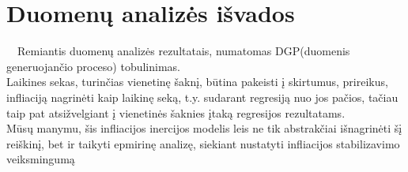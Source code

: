 \documentclass[a4paper]{article}
\begin{document}
\newpage
\section{Duomenų analizės išvados}
\textnormal{\             \ Remiantis duomenų analizės rezultatais, numatomas DGP(duomenis generuojančio proceso) tobulinimas.\\ Laikines sekas, turinčias vienetinę šaknį, būtina pakeisti į skirtumus, prireikus, infliaciją nagrinėti kaip laikinę seką,  t.y. sudarant regresiją nuo jos pačios, tačiau taip pat atsižvelgiant į vienetinės šaknies  įtaką regresijos rezultatams.\\ Mūsų manymu, šis infliacijos inercijos modelis leis ne tik abstrakčiai išnagrinėti šį reiškinį, bet ir taikyti epmirinę analizę, siekiant nustatyti infliacijos stabilizavimo veiksmingumą}
\end{document}
